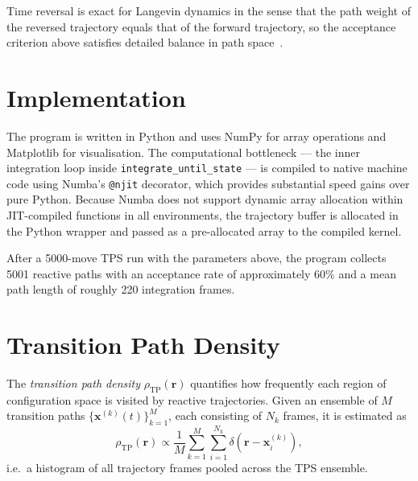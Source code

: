 \documentclass[11pt,a4paper]{article}
\begin{document}
Time reversal is exact for Langevin dynamics in the sense that the path weight
of the reversed trajectory equals that of the forward trajectory, so the
acceptance criterion above satisfies detailed balance in path
space~\cite{Bolhuis2002}.

\section{Implementation}

The program is written in Python and uses NumPy for array operations and
Matplotlib for visualisation.  The computational bottleneck — the inner
integration loop inside \texttt{integrate\_until\_state} — is compiled to
native machine code using Numba's \texttt{@njit} decorator, which provides
substantial speed gains over pure Python.  Because Numba does not support
dynamic array allocation within JIT-compiled functions in all environments, the
trajectory buffer is allocated in the Python wrapper and passed as a
pre-allocated array to the compiled kernel.

After a 5000-move TPS run with the parameters above, the program collects
5001 reactive paths with an acceptance rate of approximately 60\% and a mean
path length of roughly 220 integration frames.

\section{Transition Path Density}

The \emph{transition path density} $\rho_\mathrm{TP}(\mathbf{r})$ quantifies
how frequently each region of configuration space is visited by reactive
trajectories.  Given an ensemble of $M$ transition paths
$\{\mathbf{x}^{(k)}(t)\}_{k=1}^{M}$, each consisting of $N_k$ frames, it is
estimated as
\begin{equation}
    \rho_\mathrm{TP}(\mathbf{r}) \propto
    \frac{1}{M} \sum_{k=1}^{M} \sum_{i=1}^{N_k}
    \delta\!\left(\mathbf{r} - \mathbf{x}^{(k)}_i\right),
\end{equation}
i.e.\ a histogram of all trajectory frames pooled across the TPS ensemble.
\end{document}
